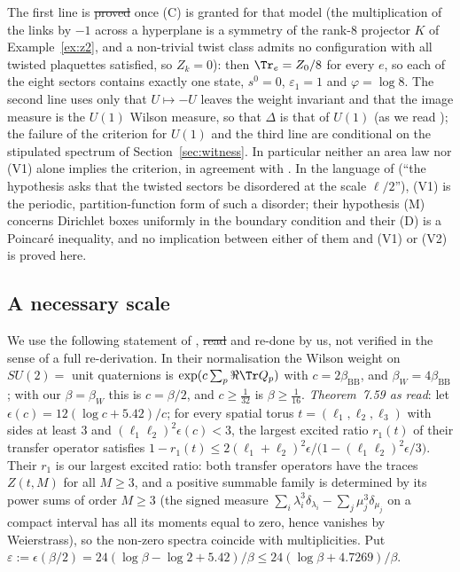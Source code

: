 The first line is \st{proved} once (C) is granted for that model (the multiplication of the links by $-1$ across a hyperplane is a symmetry of the rank-$8$ projector $K$ of Example~\ref{ex:z2}, and a non-trivial twist class admits no configuration with all twisted plaquettes satisfied, so $Z_k=0$): then $\Tr_e=Z_0/8$ for every $e$, so each of the eight sectors contains exactly one state, $s^0=0$, $\varepsilon_1=1$ and $\varphi=\log8$. The second line uses only that $U\mapsto-U$ leaves the weight invariant and that the image measure is the $U(1)$ Wilson measure, so that $\Delta$ is that of $U(1)$ (as we read \cite[Prop.~11.29]{BB26v5}); the failure of the criterion for $U(1)$ and the third line are conditional on the stipulated spectrum of Section~\ref{sec:witness}. In particular neither an area law nor (V1) alone implies the criterion, in agreement with \cite[Prop.~11.29]{BB26v5}. In the language of \cite[l.~6681--6686]{BB26v5} (``the hypothesis asks that the twisted sectors be disordered at the scale $\ell/2$''), (V1) is the periodic, partition-function form of such a disorder; their hypothesis (M) concerns Dirichlet boxes uniformly in the boundary condition and their (D) is a Poincar\'e inequality, and no implication between either of them and (V1) or (V2) is proved here.

\subsection{A necessary scale}\label{subsec:T5}
We use the following statement of \cite{BB26v5}, \st{read} and re-done by us, not verified in the sense of a full re-derivation. In their normalisation the Wilson weight on $SU(2)=$ unit quaternions is $\exp(c\sum_p\Re\Tr Q_p)$ with $c=2\beta_{\mathrm{BB}}$, and $\beta_W=4\beta_{\mathrm{BB}}$; with our $\beta=\beta_W$ this is $c=\beta/2$, and $c\ge\frac1{32}$ is $\beta\ge\frac1{16}$. \emph{Theorem~7.59 as read}: let $\epsilon(c)=12(\log c+5.42)/c$; for every spatial torus $t=(\ell_1,\ell_2,\ell_3)$ with sides at least $3$ and $(\ell_1\ell_2)^2\epsilon(c)<3$, the largest excited ratio $r_1(t)$ of their transfer operator satisfies $1-r_1(t)\le2(\ell_1+\ell_2)^2\epsilon/\bigl(1-(\ell_1\ell_2)^2\epsilon/3\bigr)$. Their $r_1$ is our largest excited ratio: both transfer operators have the traces $Z(t,M)$ for all $M\ge3$, and a positive summable family is determined by its power sums of order $M\ge3$ (the signed measure $\sum_i\lambda_i^3\delta_{\lambda_i}-\sum_j\mu_j^3\delta_{\mu_j}$ on a compact interval has all its moments equal to zero, hence vanishes by Weierstrass), so the non-zero spectra coincide with multiplicities. Put $\varepsilon:=\epsilon(\beta/2)=24(\log\beta-\log2+5.42)/\beta\le24(\log\beta+4.7269)/\beta$.

